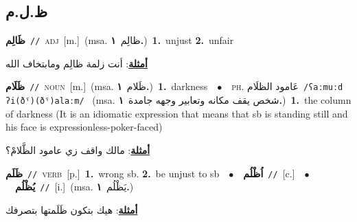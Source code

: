 \documentclass[10pt,a4paper,twoside]{article} %
\begin{document}
\begin{multicols}{2}
\vspace{-3mm}
\subsection*{\color{blue}\foreignlanguage{arabic}{ظ.ل.م}\color{blue}{}} 

{\setlength\topsep{0pt}\textbf{\foreignlanguage{arabic}{ظَالِم}}\ {\color{gray}\texttt{//}\color{black}}\ \textsc{adj}\ [m.]\ \color{gray}(msa. \foreignlanguage{arabic}{ظالِم}~\foreignlanguage{arabic}{\textbf{١.}})\color{black}\ \textbf{1.}~unjust  \textbf{2.}~unfair\  \begin{flushright}\color{gray}\foreignlanguage{arabic}{\textbf{\underline{\foreignlanguage{arabic}{أمثلة}}}: أنت زلمة ظالِم ومابتخاف الله}\end{flushright}\color{black}} \vspace{2mm}

{\setlength\topsep{0pt}\textbf{\foreignlanguage{arabic}{ظَلَام}}\ {\color{gray}\texttt{//}\color{black}}\ \textsc{noun}\ [m.]\ \color{gray}(msa. \foreignlanguage{arabic}{ظَلام}~\foreignlanguage{arabic}{\textbf{١.}})\color{black}\ \textbf{1.}~darkness\ \ $\bullet$\ \ \textsc{ph.} \color{gray} \foreignlanguage{arabic}{عَامود الظلَام}\color{black}\ {\color{gray}\texttt{/{\sffamily ʕaːmuːd ʔi(ðˤ)(ðˤ)alaːm}/}\color{black}}\ \color{gray} (msa. \foreignlanguage{arabic}{شخص يقف مكانه وتعابير وجهه جامدة}~\foreignlanguage{arabic}{\textbf{١.}})\color{black}\ \textbf{1.}~the column of darkness (It is an idiomatic expression that means that sb is standing still and his face is expressionless-poker-faced)\  \begin{flushright}\color{gray}\foreignlanguage{arabic}{\textbf{\underline{\foreignlanguage{arabic}{أمثلة}}}: مالك واقف زي عامود الظَّلامْ؟}\end{flushright}\color{black}} \vspace{2mm}

{\setlength\topsep{0pt}\textbf{\foreignlanguage{arabic}{ظَلَم}}\ {\color{gray}\texttt{//}\color{black}}\ \textsc{verb}\ [p.]\ \textbf{1.}~wrong sb.  \textbf{2.}~be unjust to sb\ \ $\bullet$\ \ \setlength\topsep{0pt}\textbf{\foreignlanguage{arabic}{اُظْلُم}}\ {\color{gray}\texttt{//}\color{black}}\ [c.]\ \ $\bullet$\ \ \setlength\topsep{0pt}\textbf{\foreignlanguage{arabic}{يُظْلُم}}\ {\color{gray}\texttt{//}\color{black}}\ [i.]\ \color{gray}(msa. \foreignlanguage{arabic}{يَظْلُم}~\foreignlanguage{arabic}{\textbf{١.}})\color{black}\  \begin{flushright}\color{gray}\foreignlanguage{arabic}{\textbf{\underline{\foreignlanguage{arabic}{أمثلة}}}: هيك بتكون ظَلَمتها بتصرفك}\end{flushright}\color{black}} \vspace{2mm}


\end{multicols}
\end{document}

